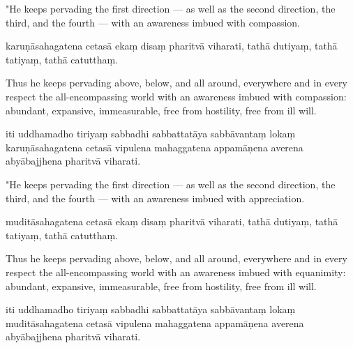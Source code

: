 \begin{samepage}
\begin{leftcolumn*}
"He keeps pervading the first direction — as well as the second direction, the third, and the fourth — with an awareness imbued with compassion.
\end{leftcolumn*}

\begin{rightcolumn}
karuṇāsahagatena cetasā ekaṃ disaṃ pharitvā viharati, tathā dutiyaṃ, tathā tatiyaṃ, tathā catutthaṃ.
\end{rightcolumn}
\end{samepage}

\begin{samepage}
\begin{leftcolumn*}
Thus he keeps pervading above, below, and all around, everywhere and in every respect the all-encompassing world with an awareness imbued with compassion: abundant, expansive, immeasurable, free from hostility, free from ill will.
\end{leftcolumn*}

\begin{rightcolumn}
iti uddhamadho tiriyaṃ sabbadhi sabbattatāya sabbāvantaṃ lokaṃ karuṇāsahagatena cetasā vipulena mahaggatena appamāṇena averena abyābajjhena pharitvā viharati.
\end{rightcolumn}
\end{samepage}

\begin{samepage}
\begin{leftcolumn*}
"He keeps pervading the first direction — as well as the second direction, the third, and the fourth — with an awareness imbued with appreciation.
\end{leftcolumn*}

\begin{rightcolumn}
muditāsahagatena cetasā ekaṃ disaṃ pharitvā viharati, tathā dutiyaṃ, tathā tatiyaṃ, tathā catutthaṃ.
\end{rightcolumn}
\end{samepage}

\begin{samepage}
\begin{leftcolumn*}
Thus he keeps pervading above, below, and all around, everywhere and in every respect the all-encompassing world with an awareness imbued with equanimity: abundant, expansive, immeasurable, free from hostility, free from ill will.
\end{leftcolumn*}

\begin{rightcolumn}
iti uddhamadho tiriyaṃ sabbadhi sabbattatāya sabbāvantaṃ lokaṃ muditāsahagatena cetasā vipulena mahaggatena appamāṇena averena abyābajjhena pharitvā viharati.
\end{rightcolumn}
\end{samepage}

